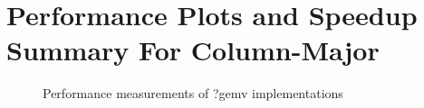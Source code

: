 \clearpage
\section{Performance Plots and Speedup Summary For Column-Major}

\begin{figure}[htb]
    \centering
    \caption*{Performance measurements of ?gemv implementations}
    \label{fig:mtv_col_Sgflop220}
    \qquad
    \label{fig:mtv_col_Dgflop220}
\end{figure}

